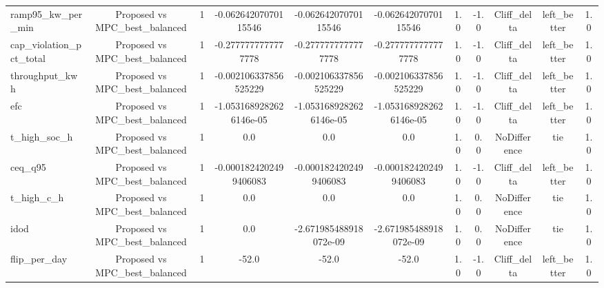 \begin{table}[t]
\begin{tabular}{lcccccccccc}
ramp95\_kw\_per\_min & Proposed vs MPC\_best\_balanced & 1 & -0.06264207070115546 & -0.06264207070115546 & -0.06264207070115546 & 1.0 & -1.0 & Cliff\_delta & left\_better & 1.0 \\
cap\_violation\_pct\_total & Proposed vs MPC\_best\_balanced & 1 & -0.2777777777777778 & -0.2777777777777778 & -0.2777777777777778 & 1.0 & -1.0 & Cliff\_delta & left\_better & 1.0 \\
throughput\_kwh & Proposed vs MPC\_best\_balanced & 1 & -0.002106337856525229 & -0.002106337856525229 & -0.002106337856525229 & 1.0 & -1.0 & Cliff\_delta & left\_better & 1.0 \\
efc & Proposed vs MPC\_best\_balanced & 1 & -1.0531689282626146e-05 & -1.0531689282626146e-05 & -1.0531689282626146e-05 & 1.0 & -1.0 & Cliff\_delta & left\_better & 1.0 \\
t\_high\_soc\_h & Proposed vs MPC\_best\_balanced & 1 & 0.0 & 0.0 & 0.0 & 1.0 & 0.0 & NoDifference & tie & 1.0 \\
ceq\_q95 & Proposed vs MPC\_best\_balanced & 1 & -0.0001824202499406083 & -0.0001824202499406083 & -0.0001824202499406083 & 1.0 & -1.0 & Cliff\_delta & left\_better & 1.0 \\
t\_high\_c\_h & Proposed vs MPC\_best\_balanced & 1 & 0.0 & 0.0 & 0.0 & 1.0 & 0.0 & NoDifference & tie & 1.0 \\
idod & Proposed vs MPC\_best\_balanced & 1 & 0.0 & -2.671985488918072e-09 & -2.671985488918072e-09 & 1.0 & 0.0 & NoDifference & tie & 1.0 \\
flip\_per\_day & Proposed vs MPC\_best\_balanced & 1 & -52.0 & -52.0 & -52.0 & 1.0 & -1.0 & Cliff\_delta & left\_better & 1.0 \\
\bottomrule
\end{tabular}
\end{table}